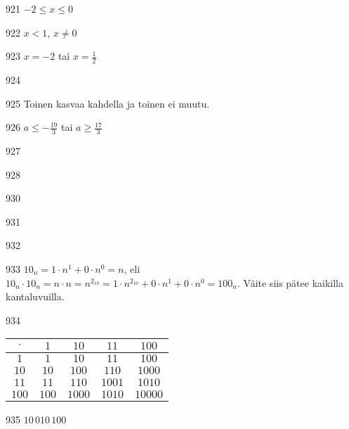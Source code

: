 \begin{Vastaus}{921}
$-2 \leq x \leq 0$
\end{Vastaus}
\begin{Vastaus}{922}
$x<1$, $x\neq0$
\end{Vastaus}
\begin{Vastaus}{923}
$x=-2$ tai $x=\frac{1}{2}$
\end{Vastaus}
\begin{Vastaus}{924}
    
\end{Vastaus}
\begin{Vastaus}{925}
     Toinen kasvaa kahdella ja toinen ei muutu.
    
\end{Vastaus}
\begin{Vastaus}{926}
$a \leq -\frac{19}{3}$ tai $a \geq \frac{17}{3}$
\end{Vastaus}
\begin{Vastaus}{927}
\end{Vastaus}
\begin{Vastaus}{928}
\end{Vastaus}
\begin{Vastaus}{930}
	
\end{Vastaus}
\begin{Vastaus}{931}
\end{Vastaus}
\begin{Vastaus}{932}
\end{Vastaus}
\begin{Vastaus}{933}
$10_n=1\cdot n^1+0\cdot n^0=n$, eli $10_n \cdot 10_n =n\cdot n = n^{2_{10}}= 1\cdot n^{2_{10}} + 0 \cdot n^1 + 0\cdot n^0 =100_n$. Väite siis pätee kaikilla kantaluvuilla.
	
\end{Vastaus}
\begin{Vastaus}{934}
\begin{tabular}{|c||c|c|c|c|}
	\hline
	$\cdot$ & $1$ & $10$ & $11$ & $100$ \\
	\hline
	\hline
	$1$ & $1$ & $10$ & $11$ & $100$ \\
	\hline
	$10$ & $10$ & $100$ & $110$ & $1000$  \\
	\hline
	$11$ & $11$ & $110$ & $1001$ & $1010$ \\
	\hline
	$100$ & $100$ & $1000$ & $1010$ & $10000$ \\
	\hline
	\end{tabular}
	
\end{Vastaus}
\begin{Vastaus}{935}
		$10\,010\,100$
	
\end{Vastaus}
